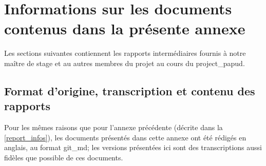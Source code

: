 \section{Informations sur les documents contenus dans la présente annexe}
Les sections suivantes contiennent les rapports intermédiaires fournis à notre maître de stage et au autres membres du projet au cours du \gls{project_papud}.

\subsection{Format d'origine, transcription et contenu des rapports}
Pour les mêmes raisons que pour l'annexe précédente (décrite dans la \autoref{report_infos}), les documents présentés dans cette annexe ont été rédigés en anglais, au format \gls{git_md}; les versions présentées ici sont des transcriptions aussi fidèles que possible de ces documents.

